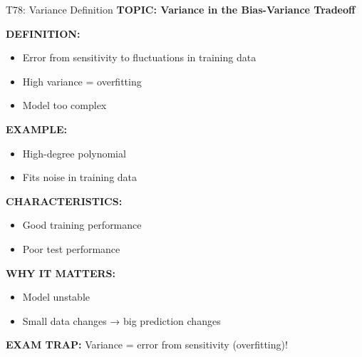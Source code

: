 \documentclass[8pt]{beamer}
\begin{document}
	\begin{frame}{T78: Variance Definition}
		\fontsize{6.5}{7.5}\selectfont
		\textbf{TOPIC: Variance in the Bias-Variance Tradeoff}
		
		\vspace{0.1cm}
		\textbf{DEFINITION:}
		\begin{itemize}
			\item Error from sensitivity to fluctuations in training data
			\item High variance = overfitting
			\item Model too complex
		\end{itemize}
		
		\vspace{0.1cm}
		\textbf{EXAMPLE:}
		\begin{itemize}
			\item High-degree polynomial
			\item Fits noise in training data
		\end{itemize}
		
		\vspace{0.1cm}
		\textbf{CHARACTERISTICS:}
		\begin{itemize}
			\item Good training performance
			\item Poor test performance
		\end{itemize}
		
		\vspace{0.1cm}
		\textbf{WHY IT MATTERS:}
		\begin{itemize}
			\item Model unstable
			\item Small data changes → big prediction changes
		\end{itemize}
		
		\textcolor{myred}{\textbf{EXAM TRAP:}} Variance = \textcolor{myblue}{error from sensitivity} (overfitting)!
	\end{frame}
	
\end{document}
